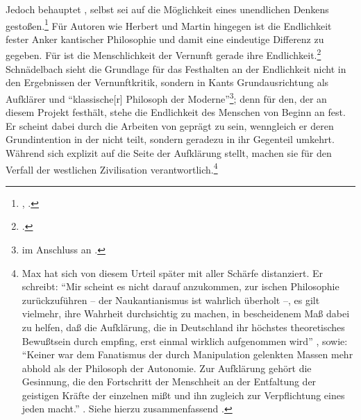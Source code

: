 \label{paragraph:schnaedelbachhegeladornohorkheimer} Jedoch
behauptet ,  selbst sei
auf die Möglichkeit eines unendlichen Denkens
gestoßen.\footnote{\cite[Vgl.][]{Hegel:GlaubenundWissenoderdieReflexionsphilosophiederSubjektivitaetinderVollstaendigkeitihrerFormenalsKantischeJacobischeundFichteschePhilosophie1968},
\cite[][IV: 341.7--8, 341.24--34, 344.30--345.1]{Hegel:GesammelteWerke}.} Für
Autoren wie Herbert  und Martin
 hingegen ist die Endlichkeit fester Anker kantischer
Philosophie und damit eine eindeutige Differenz zu
 gegeben. Für  ist die
Menschlichkeit der Vernunft gerade ihre
Endlichkeit.\footnote{\cite[Vgl.][21]{Heidegger:KantunddasProblemderMetaphysik1965}.}
Schnädelbach sieht die Grundlage für das Festhalten an der Endlichkeit nicht in
den Ergebnissen der Vernunftkritik, sondern in Kants Grundausrichtung als
Aufklärer und \enquote{klassische[r] Philosoph der
Moderne}\footnote{\cite[][838]{Schnaedelbach:WirKantianer2005} im Anschluss an
\cite{Rickert:KantalsPhilosophdermodernenKultur1924}.}; denn für den, der an
diesem Projekt festhält, stehe die Endlichkeit des Menschen von Beginn an fest.
Er scheint dabei durch die Arbeiten von
 geprägt zu sein,
wenngleich er deren Grundintention in der  nicht
teilt, sondern geradezu in ihr Gegenteil umkehrt. Während
 sich explizit auf die Seite der Aufklärung stellt,
machen  sie für den Verfall
der westlichen Zivilisation verantwortlich.\footnote{Max 
hat sich von diesem Urteil später mit aller Schärfe distanziert. Er schreibt:
\enquote{Mir scheint es nicht darauf anzukommen, zur ischen
Philosophie zurückzuführen -- der Naukantianismus ist wahrlich überholt --, es
gilt vielmehr, ihre Wahrheit durchsichtig zu machen, in bescheidenem Maß dabei
zu helfen, daß die Aufklärung, die in Deutschland ihr höchstes theoretisches
Bewußtsein durch  empfing, erst einmal wirklich aufgenommen
wird} \parencite[][206]{Horkheimer:KantsPhilosophieunddieAufklaerung1967},
sowie: \enquote{Keiner war dem Fanatismus der durch Manipulation gelenkten
Massen mehr abhold als der Philosoph der Autonomie. Zur Aufklärung gehört die Gesinnung, die
den Fortschritt der Menschheit an der Entfaltung der geistigen Kräfte der
einzelnen mißt und ihn zugleich zur Verpflichtung eines jeden macht.}
\parencite[][214]{Horkheimer:KantsPhilosophieunddieAufklaerung1967}.
Siehe hierzu zusammenfassend \cite[15--17]{Recki:KantunddieAufklaerung2006}.}
